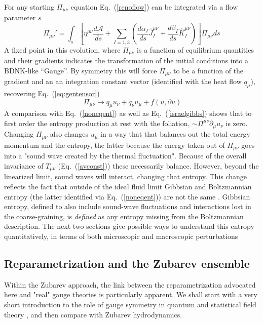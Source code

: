 \documentclass[12pt,onecolumn,showpacs,amssymb,aps,nofootinbib,floatfix]{revtex4-2}
\renewcommand{\eqref}[1]{Eq.~(\ref{#1})}
\begin{document}
	For any starting $\Pi_{\mu \nu}$ equation \eqref{renoflow} can be integrated via a flow parameter $s$
	\begin{equation}
		\label{renoflow}
		\Pi_{\mu \nu}' = \int_{s}  \left[ \eta^{\mu \nu} \frac{d\mathcal{ A}}{ds}+ \sum_{I=1,3} \left( \frac{d \alpha_I}{ds} \hat{J}^{\mu \nu}_I + \frac{d \beta_I}{ds} \hat{K}^{\mu \nu}_I \right) \right]\Pi_{\mu \nu} ds
	\end{equation}
	A fixed point in this evolution, where $\Pi_{\mu \nu}$ is a function of equilibrium quantities and their gradients indicates the transformation of the initial 
conditions into a BDNK-like ``Gauge''.
By symmetry this will force $\Pi_{\mu \nu}$ to be a function of the gradient and an 
an integration constant vector (identified with the heat flow $q_\mu$), recovering \eqref{eq:gentensor}
\[\ \Pi_{\mu \nu} \rightarrow q_\mu u_\nu + q_\nu u_\mu + f(u,\partial u)  \]
	A comparison with \eqref{noneqent} as well as \eqref{israelgibbs} shows that to first order the entropy production at rest with the foliation, 
	$\sim \Pi^{\mu \nu} \partial_\mu u_\nu$ is zero.  Changing $\Pi_{\mu \nu}$ also changes $u_\mu$ in a way that that balances out the total energy momentum and the entropy, the latter because the energy taken out of $\Pi_{\mu \nu}$ goes into a "sound wave created by the thermal fluctuation".  Because of the overall invariance of $T_{\mu \nu}$ (\eqref{avconst}) these necessarily balance.   However, beyond the linearized limit, sound waves will interact, changing that entropy. This change reflects the fact that outside of the ideal fluid limit Gibbsian and Boltzmannian entropy (the latter identified via \eqref{noneqent}) are not the same \cite{jaynes}.  Gibbsian entropy, defined to also include sound-wave fluctuations and interactions lost in the coarse-graining, is {\em defined} as any entropy missing from the Boltzmannian description.   The next two sections give possible ways to understand this entropy quantitatively, in terms of both microscopic and macroscopic perturbations	
	\subsection{Reparametrization and the Zubarev ensemble \label{justzub}}
	\color{black}
	Within the Zubarev approach, the link between the reparametrization advocated here and "real" gauge theories is particularly apparent.
We shall start with a very short introduction to the role of gauge symmetry in quantum and statistical field theory \cite{peskin}, and then compare with Zubarev hydrodynamics.
         
\end{document}
